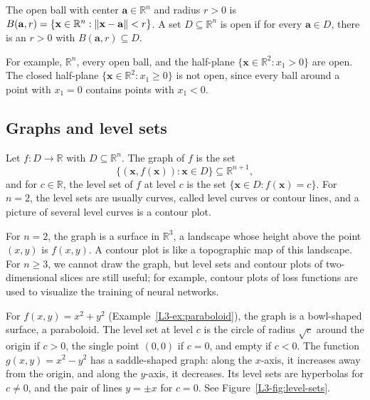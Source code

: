 \begin{definition}\label{L3-def:open}
    The open ball with center $\mathbf{a} \in \mathbb{R}^n$ and radius $r > 0$ is $B(\mathbf{a}, r) = \{\mathbf{x} \in \mathbb{R}^n : \lVert \mathbf{x} - \mathbf{a} \rVert < r\}$. A set $D \subseteq \mathbb{R}^n$ is open if for every $\mathbf{a} \in D$, there is an $r > 0$ with $B(\mathbf{a}, r) \subseteq D$.
\end{definition}

For example, $\mathbb{R}^n$, every open ball, and the half-plane $\{\mathbf{x} \in \mathbb{R}^2 : x_1 > 0\}$ are open. The closed half-plane $\{\mathbf{x} \in \mathbb{R}^2 : x_1 \geq 0\}$ is not open, since every ball around a point with $x_1 = 0$ contains points with $x_1 < 0$.

\subsection{Graphs and level sets}

\begin{definition}\label{L3-def:level-sets}
    Let $f: D \to \mathbb{R}$ with $D \subseteq \mathbb{R}^n$. The graph of $f$ is the set
    \[\{(\mathbf{x}, f(\mathbf{x})) : \mathbf{x} \in D\} \subseteq \mathbb{R}^{n+1},\]
    and for $c \in \mathbb{R}$, the level set of $f$ at level $c$ is the set $\{\mathbf{x} \in D : f(\mathbf{x}) = c\}$. For $n = 2$, the level sets are usually curves, called level curves or contour lines, and a picture of several level curves is a contour plot.
\end{definition}

For $n = 2$, the graph is a surface in $\mathbb{R}^3$, a landscape whose height above the point $(x, y)$ is $f(x, y)$. A contour plot is like a topographic map of this landscape. For $n \geq 3$, we cannot draw the graph, but level sets and contour plots of two-dimensional slices are still useful; for example, contour plots of loss functions are used to visualize the training of neural networks.

\begin{example}\label{L3-ex:level-sets}
    For $f(x, y) = x^2 + y^2$ (Example~\ref{L3-ex:paraboloid}), the graph is a bowl-shaped surface, a paraboloid. The level set at level $c$ is the circle of radius $\sqrt{c}$ around the origin if $c > 0$, the single point $(0, 0)$ if $c = 0$, and empty if $c < 0$. The function $g(x, y) = x^2 - y^2$ has a saddle-shaped graph: along the $x$-axis, it increases away from the origin, and along the $y$-axis, it decreases. Its level sets are hyperbolas for $c \neq 0$, and the pair of lines $y = \pm x$ for $c = 0$. See Figure~\ref{L3-fig:level-sets}.
\end{example}

